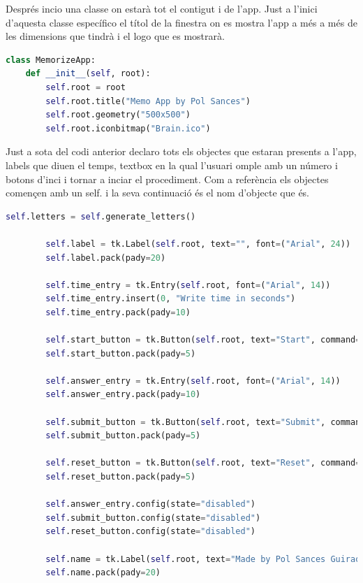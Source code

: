 Després incio una classe on estarà tot el contigut i de l'app. Just a l'inici d'aquesta classe específico el títol de la finestra on es mostra l'app a més a més de les dimensions que tindrà i el logo que es mostrarà. 

\begin{lstlisting}[language=Python, style=colorEX, caption=Inici de la classe i especificació de la finestra]
class MemorizeApp:    
    def __init__(self, root):
        self.root = root
        self.root.title("Memo App by Pol Sances")
        self.root.geometry("500x500")
        self.root.iconbitmap("Brain.ico")
\end{lstlisting}

Just a sota del codi anterior declaro tots els objectes que estaran presents a l'app, labels que diuen el temps, textbox en la qual l'usuari omple amb un número i botons d'inci i tornar a inciar el procediment. Com a referència els objectes començen amb un self. i la seva continuació és el nom d'objecte que és. 
\begin{lstlisting}[language=Python, style=colorEX, caption=Declaració d'objectes necessaris pel funcionament de l'App]
        self.letters = self.generate_letters()

        self.label = tk.Label(self.root, text="", font=("Arial", 24))
        self.label.pack(pady=20)

        self.time_entry = tk.Entry(self.root, font=("Arial", 14))
        self.time_entry.insert(0, "Write time in seconds")
        self.time_entry.pack(pady=10)

        self.start_button = tk.Button(self.root, text="Start", command=self.start_memorize)
        self.start_button.pack(pady=5)

        self.answer_entry = tk.Entry(self.root, font=("Arial", 14))
        self.answer_entry.pack(pady=10)

        self.submit_button = tk.Button(self.root, text="Submit", command=self.check_answers)
        self.submit_button.pack(pady=5)

        self.reset_button = tk.Button(self.root, text="Reset", command=self.reset)
        self.reset_button.pack(pady=5)

        self.answer_entry.config(state="disabled")
        self.submit_button.config(state="disabled")
        self.reset_button.config(state="disabled")

        self.name = tk.Label(self.root, text="Made by Pol Sances Guirao", font=("Arial", 8))
        self.name.pack(pady=20)
\end{lstlisting}


